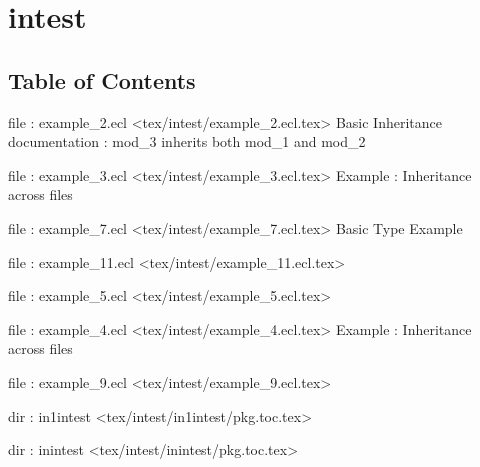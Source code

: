 \chapter*{intest}


\section*{Table of Contents}
\par
file : example\_2.ecl <tex/intest/example\_2.ecl.tex>  Basic Inheritance documentation : mod\_3 inherits both mod\_1 and mod\_2

\par
file : example\_3.ecl <tex/intest/example\_3.ecl.tex>  Example : Inheritance across files

\par
file : example\_7.ecl <tex/intest/example\_7.ecl.tex>  Basic Type Example

\par
file : example\_11.ecl <tex/intest/example\_11.ecl.tex>  

\par
file : example\_5.ecl <tex/intest/example\_5.ecl.tex>  

\par
file : example\_4.ecl <tex/intest/example\_4.ecl.tex>  Example : Inheritance across files

\par
file : example\_9.ecl <tex/intest/example\_9.ecl.tex>  

\par
dir : in1intest <tex/intest/in1intest/pkg.toc.tex>  

\par
dir : inintest <tex/intest/inintest/pkg.toc.tex>  











